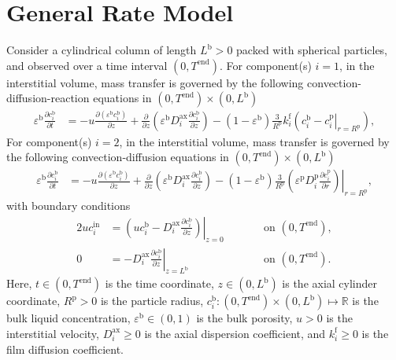 \documentclass{article}
\begin{document}
\section*{General Rate Model}
Consider a cylindrical column of length $L^{\mathrm{b}} > 0$ packed with spherical particles, and observed over a time interval $(0, T^{\mathrm{end}})$.
For component(s) $i = 1$, in the interstitial volume, mass transfer is governed by the following convection-diffusion-reaction equations in $(0, T^{\mathrm{end}})\times (0, L^{\mathrm{b}})$
\begin{align}
    \varepsilon^{\mathrm{b}} \frac{\partial c^{\mathrm{b}}_{i}}{\partial t}
    &= - u \frac{\partial \left( \varepsilon^{\mathrm{b}} c^{\mathrm{b}}_{i} \right)}{\partial z}
        + \frac{\partial}{\partial z} \left( \varepsilon^{\mathrm{b}} D^{\mathrm{ax}}_{i} \frac{\partial c^{\mathrm{b}}_{i}}{\partial z} \right)
        - \left(1 - \varepsilon^{\mathrm{b}} \right) \frac{3}{R^{\mathrm{p}}} k^{\mathrm{f}}_{i} \left(c^{\mathrm{b}}_{i} - \left. c^{\mathrm{p}}_{i} \right|_{r = R^{\mathrm{p}}} \right),
\end{align}
For component(s) $i = 2$, in the interstitial volume, mass transfer is governed by the following convection-diffusion equations in $(0, T^{\mathrm{end}})\times (0, L^{\mathrm{b}})$
\begin{align}
    \varepsilon^{\mathrm{b}} \frac{\partial c^{\mathrm{b}}_{i}}{\partial t}
    &= - u \frac{\partial \left( \varepsilon^{\mathrm{b}} c^{\mathrm{b}}_{i} \right)}{\partial z}
        + \frac{\partial}{\partial z} \left( \varepsilon^{\mathrm{b}} D^{\mathrm{ax}}_{i} \frac{\partial c^{\mathrm{b}}_{i}}{\partial z} \right)
        - \left(1 - \varepsilon^{\mathrm{b}} \right) \frac{3}{R^{\mathrm{p}}} \left( \varepsilon^{\mathrm{p}} D^{\mathrm{p}}_{i} \left. \frac{\partial c^{\mathrm{p}}_{i}}{\partial r}\right)\right|_{r = R^{\mathrm{p}}},
\end{align}
with boundary conditions
\begin{alignat}{2}
    u c^{\mathrm{in}}_{i}
    &= \left.\left( u c^{\mathrm{b}}_{i} - D^{\mathrm{ax}}_{i} \frac{\partial c^{\mathrm{b}}_{i}}{\partial z}\right)\right|_{z=0}
    & & \qquad\text{on }(0, T^{\mathrm{end}}),
    \\
    0
    &= - D^{\mathrm{ax}}_{i} \left. \frac{\partial c^{\mathrm{b}}_{i}}{\partial z} \right|_{z=L^{\mathrm{b}}}
    & & \qquad\text{on }(0, T^{\mathrm{end}}).
\end{alignat}
Here, $t\in (0, T^{\mathrm{end}})$ is the time coordinate, $z\in (0, L^{\mathrm{b}})$ is the axial cylinder coordinate, $R^{\mathrm{p}}> 0$ is the particle radius, $c^{\mathrm{b}}_{i}\colon (0, T^{\mathrm{end}})\times (0, L^{\mathrm{b}}) \mapsto \mathbb{R}$ is the bulk liquid concentration, $\varepsilon^{\mathrm{b}}\in (0, 1)$ is the bulk porosity, $u> 0$ is the interstitial velocity, $D^{\mathrm{ax}}_{i}\geq 0$ is the axial dispersion coefficient, and $k^{\mathrm{f}}_{i}\geq 0$ is the film diffusion coefficient.
\end{document}
